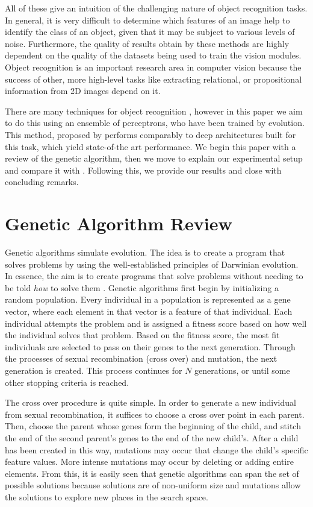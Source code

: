 \documentclass[conference]{IEEEtran}
\begin{document}
All of these give an intuition of the challenging nature of object recognition tasks. In general, it is very difficult to determine which features of an image help to identify the class of an object, given that it may be subject to various levels of noise. Furthermore, the quality of results obtain by these methods are highly dependent on the quality of the datasets being used to train the vision modules. Object recognition is an important research area in computer vision because the success of other, more high-level tasks like extracting relational, or propositional information from 2D images depend on it.

There are many techniques for object recognition \cite{sukanya2016survey}, however in this paper we aim to do this using an ensemble of perceptrons, who have been trained by evolution. This method, proposed by \cite{lillywhite2013feature} performs comparably to deep architectures built for this task, which yield state-of-the art performance. We begin this paper with a review of the genetic algorithm, then we move to explain our experimental setup and compare it with \cite{lillywhite2013feature}. Following this, we provide our results and close with concluding remarks. 
\section{Genetic Algorithm Review}
Genetic algorithms simulate evolution. The idea is to create a program that solves problems by using the well-established principles of Darwinian evolution. In essence, the aim is to create programs that solve problems without needing to be told {\it how} to solve them \cite{koza1992genetic}. Genetic algorithms first begin by initializing a random population. Every individual in a population is represented as a gene vector, where each element in that vector is a feature of that individual. Each individual attempts the problem and is assigned a fitness score based on how well the individual solves that problem. Based on the fitness score, the most fit individuals are selected to pass on their genes to the next generation. Through the processes of sexual recombination (cross over) and mutation, the next generation is created. This process continues for $N$ generations, or until some other stopping criteria is reached.

The cross over procedure is quite simple. In order to generate a new individual from sexual recombination, it suffices to choose a cross over point in each parent. Then, choose the parent whose genes form the beginning of the child, and stitch the end of the second parent's genes to the end of the new child's. After a child has been created in this way, mutations may occur that change the child's specific feature values. More intense mutations may occur by deleting or adding entire elements. From this, it is easily seen that genetic algorithms can span the set of possible solutions because solutions are of non-uniform size and mutations allow the solutions to explore new places in the search space.
\end{document}

